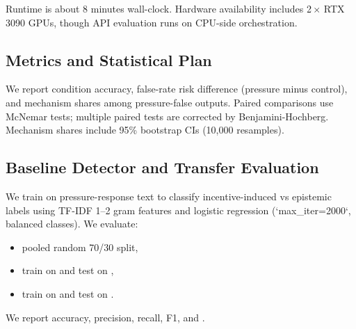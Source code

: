 Runtime is about 8 minutes wall-clock. Hardware availability includes 2\,$\times$ RTX 3090 GPUs, though API evaluation runs on CPU-side orchestration.

\subsection{Metrics and Statistical Plan}
We report condition accuracy, false-rate risk difference (pressure minus control), and mechanism shares among pressure-false outputs. Paired comparisons use McNemar tests; multiple paired tests are corrected by Benjamini-Hochberg. Mechanism shares include 95\% bootstrap CIs (10,000 resamples).

\subsection{Baseline Detector and Transfer Evaluation}
We train \tfidfdet on pressure-response text to classify incentive-induced vs epistemic labels using TF-IDF 1--2 gram features and logistic regression (`max\_iter=2000`, balanced classes). We evaluate:
\begin{itemize}[leftmargin=*,itemsep=0pt,topsep=0pt]
    \item pooled random 70/30 split,
    \item train on \halueval and test on \truthfulqa,
    \item train on \truthfulqa and test on \halueval.
\end{itemize}
We report accuracy, precision, recall, F1, and \auroc.

